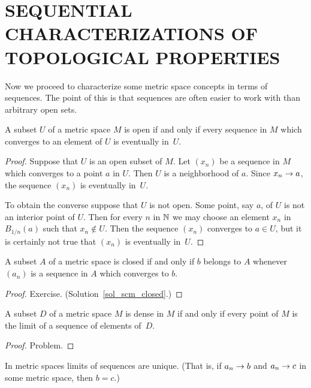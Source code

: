 \section{SEQUENTIAL CHARACTERIZATIONS OF TOPOLOGICAL PROPERTIES}
Now we proceed to characterize some metric space concepts in terms of sequences.  The point of
this is that sequences are often easier to work with than arbitrary open sets.

\begin{prop} A subset $U$ of a metric space $M$ is open if and only if every sequence in $M$
which converges to an element of $U$ is eventually in~$U$.
\end{prop}

\begin{proof} Suppose that $U$ is an open subset of $M$. Let $(x_n)$ be a sequence in $M$ which
converges to a point $a$ in $U$. Then $U$ is a neighborhood of $a$. Since $x_n \rightarrow a$, the
sequence $(x_n)$ is eventually in~$U$.

To obtain the converse suppose that $U$ is not open. Some point, say $a$, of $U$ is not an
interior point of $U$. Then for every $n$ in $\mathbb{N}$ we may choose an element $x_n$ in
$B_{1/n}(a)$ such that $x_n \notin U$. Then the sequence $(x_n)$ converges to $a \in U$, but
it is certainly not true that $(x_n)$ is eventually in~$U$.
\end{proof}

\begin{prop}\label{scm_closed} A subset $A$ of a metric space is closed if and only if $b$
belongs to $A$ whenever $(a_n)$ is a sequence in $A$ which converges to $b$.
\end{prop}

\begin{proof} Exercise. (Solution~\ref{sol_scm_closed}.)  \ns \end{proof}

\begin{prop}\label{scm_dense} A subset $D$ of a metric space $M$ is dense in $M$ if and only
if every point of $M$ is the limit of a sequence of elements of~$D$.
\end{prop}

\begin{proof} Problem. \ns \end{proof}

\begin{prop}\label{lim_uniq} In metric spaces limits of sequences are unique.  (That is,
if $a_n \rightarrow b$ and $a_n \rightarrow c$ in some metric space, then $b = c$.)
\end{prop}

